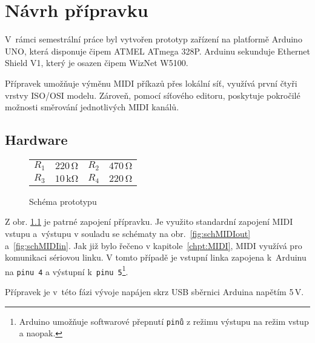 
\chapter{Návrh přípravku}
V~rámci semestrální práce byl vytvořen prototyp zařízení na platformě Ar\-du\-ino UNO, která disponuje čipem ATMEL ATmega 328P. Ar\-du\-inu sekunduje Ether\-net Shield V1, který je osazen čipem WizNet W5100. 

Přípravek umožňuje výměnu \acs{MIDI} příkazů přes lokální síť, využívá první čtyři vrstvy ISO/OSI modelu. Zároveň, pomocí síťového editoru, poskytuje pokročilé možnosti směrování jednotlivých \acs{MIDI} kanálů.

\section{Hardware}\label{chpt:Schema}
\begin{figure}[h]
    \centering
    
    \begin{tabular}{l c l c}
        \small
        $R_1$ & $220\,\mathrm{\Omega}$ & $R_2$ & $470\,\mathrm{\Omega}$ \\
        $R_3$ & $10\,\mathrm{k\Omega}$ & $R_4$ & $220\,\mathrm{\Omega}$
    \end{tabular}
    \caption{Schéma prototypu \cite{Indest}} 
    \label{fig:schPrototype}
\end{figure}

Z obr. \ref{fig:schPrototype} je patrné zapojení přípravku. Je využito standardní zapojení \acs{MIDI} vstupu a~výstupu v souladu se schématy na obr.~\ref{fig:schMIDIout} a~\ref{fig:schMIDIin}. Jak již bylo řečeno v kapitole~\ref{chpt:MIDI}, \acs{MIDI} využívá pro komunikaci sériovou linku. V tomto případě je vstupní linka zapojena k~Arduinu na \texttt{pinu~4} a výstupní k~\texttt{pinu~5}\footnote{Arduino umožňuje softwarové přepnutí \texttt{pinů} z režimu výstupu na režim vstup a naopak.}. 


Přípravek je v~této fázi vývoje napájen skrz \acs{USB} sběrnici Arduina napětím 5\,\unit{V}. 


